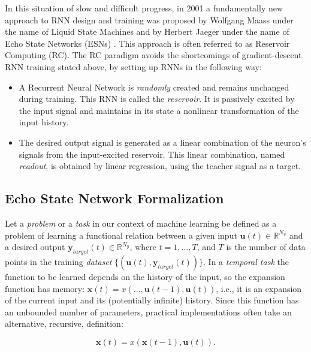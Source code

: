 In this situation of slow and difficult progress, in 2001 a fundamentally new approach to RNN design and training was proposed by Wolfgang Maass under the name of Liquid State Machines \cite{maass2002real} and by Herbert Jaeger under the name of Echo State Networks (ESNs) \cite{jaeger2001echo}. This approach is often referred to as Reservoir Computing (RC). The RC paradigm avoids the shortcomings of gradient-descent RNN training stated above, by setting up RNNs in the following way:

\begin{itemize}
    \item A Recurrent Neural Network is \textit{randomly} created and remains unchanged during training. This RNN is called the \textit{reservoir}. It is passively excited by the input signal and maintains in its state a nonlinear transformation of the input history.
    
    \item The desired output signal is generated as a linear combination of the neuron’s signals from the input-excited reservoir. This linear combination, named \textit{readout}, is obtained by linear regression, using the teacher signal as a target.
\end{itemize}

\subsection{Echo State Network Formalization}

Let a \textit{problem} or a \textit{task} in our context of machine learning be defined as a problem of learning a functional relation between a given input $\textbf{u}(t) \in \mathbb{R}^{N_u}$ and a desired output $\textbf{y}_{target}(t) \in \mathbb{R}^{N_y}$, where $t=1,\dots ,T$, and $T$ is the number of data points in the training \textit{dataset} $\{(\textbf{u}(t), \textbf{y}_{target}(t))\}$. In a \textit{temporal task} the function to be learned depends on the history of the input, so the expansion function has memory: $\textbf{x}(t)=x(\dots, \textbf{u}(t-1), \textbf{u}(t))$, i.e., it is an expansion of the current input and its (potentially infinite) history. Since this function has an unbounded number of parameters, practical implementations often take an alternative, recursive, definition:

\begin{equation}\label{eq:temporal_task}
    \textbf{x}(t)=x(\textbf{x}(t-1), \textbf{u}(t)).
\end{equation}

